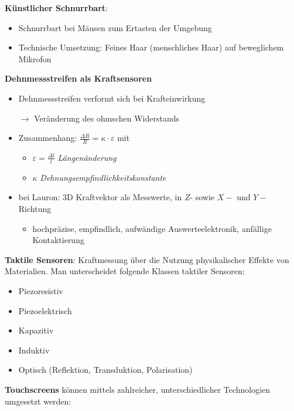 \textbf{Künstlicher Schnurrbart}:
\begin{itemize}
\item Schnurrbart bei Mäusen zum Ertasten der Umgebung
\item Technische Umsetzung: Feines Haar (menschliches Haar) auf beweglichem Mikrofon
\end{itemize}
\textbf{Dehnmessstreifen als Kraftsensoren}
\begin{itemize}
\item Dehnmessstreifen verformt sich bei Krafteinwirkung
\item[$\rightarrow$] Veränderung des ohmschen Widerstands
\item Zusammenhang: $\frac{\Delta R}{R} = \kappa \cdot \varepsilon$ mit
\begin{itemize}
\item $\varepsilon = \frac{\Delta l}{l}$ \textit{Längenänderung}
\item $\kappa$ \textit{Dehnungsempfindlichkeitskonstante}
\end{itemize}
\item bei Lauron:  3D Kraftvektor als Messwerte, in $Z$- sowie $X-$ und $Y-$Richtung
\begin{itemize}
\item hochpräzise, empfindlich, aufwändige Auswerteelektronik, anfällige Kontaktierung
\end{itemize}
\end{itemize}
\textbf{Taktile Sensoren}: Kraftmessung über die Nutzung physikalischer Effekte von
Materialien. Man unterscheidet folgende Klassen taktiler Sensoren:
\begin{itemize}
\item Piezoresistiv
\item Piezoelektrisch
\item Kapazitiv
\item Induktiv
\item Optisch (Reflektion, Transduktion, Polarisation)
\end{itemize}
\textbf{Touchscreens} können mittels zahlreicher, unterschiedlicher Technologien umgesetzt werden:
